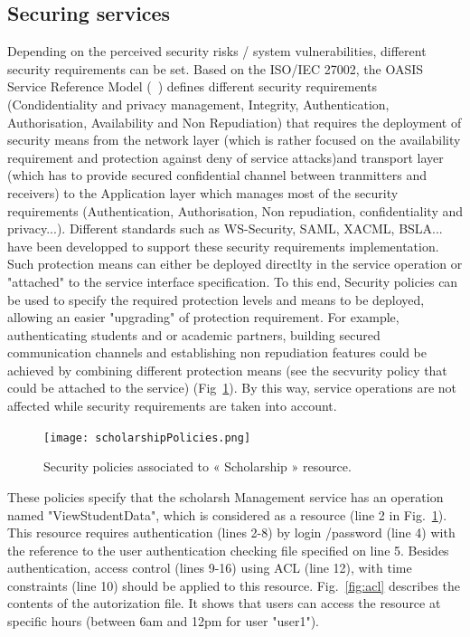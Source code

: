 \documentclass[runningheads,a4paper]{llncs}
\begin{document}
\subsection{Securing services}
Depending on the perceived security risks / system vulnerabilities, different security requirements can be set. Based on the ISO/IEC 27002, the OASIS Service Reference Model (~\cite{OAS06}) defines different security requirements (Condidentiality and privacy management, Integrity, Authentication, Authorisation, Availability and Non Repudiation) that  requires the deployment of security means from the network layer (which is rather focused on the availability requirement and protection against deny of service attacks)and transport layer (which has to provide secured confidential channel between tranmitters and receivers) to the Application layer which manages most of the security requirements (Authentication, Authorisation, Non repudiation, confidentiality and privacy...). Different standards such as WS-Security, SAML, XACML, BSLA... have been developped to support these security requirements implementation.
Such protection means can either be deployed directlty in the service operation or "attached" to the service interface specification. To this end, Security policies can be used to specify the required protection levels and means to be deployed, allowing an easier "upgrading" of protection requirement. 
For example, authenticating students and or academic partners, building secured communication channels and establishing non repudiation features could be achieved by combining different protection means (see the secvurity policy that could be attached to the service) (Fig~\ref{fig:policy}). By this way, service operations are not affected while security requirements are taken into account.

\begin{figure}  
\centering
\texttt{[image: scholarshipPolicies.png]}
\caption{Security policies associated to « Scholarship » resource.}
\label{fig:policy}
\end{figure}
These policies specify that the scholarsh Management service has an operation named "ViewStudentData", which is considered as a resource (line 2 in Fig.~\ref{fig:policy}). This resource requires authentication (lines 2-8) by login /password (line 4) with the reference to the user authentication checking file specified on line 5. Besides authentication, access control (lines 9-16) using ACL (line 12), with time constraints (line 10) should be applied to this resource. Fig.~\ref{fig:acl} describes the contents of the  autorization file. It shows that users can access the resource at specific hours (between 6am and 12pm for user "user1").
 
\end{document}
